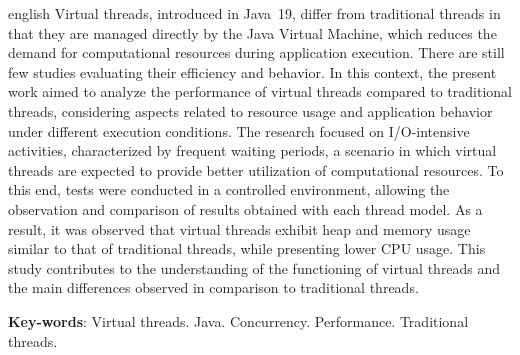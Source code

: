 \documentclass[12pt, openright, oneside, a4paper, english,	french,	spanish, brazil	]{abntex2}
\begin{document}
    \begin{resumo}[Abstract]
        \begin{otherlanguage*}{english}
            Virtual threads, introduced in Java~19, differ from traditional threads in that they are managed directly by the Java Virtual Machine, which reduces the demand for computational resources during application execution. There are still few studies evaluating their efficiency and behavior. In this context, the present work aimed to analyze the performance of virtual threads compared to traditional threads, considering aspects related to resource usage and application behavior under different execution conditions. The research focused on I/O-intensive activities, characterized by frequent waiting periods, a scenario in which virtual threads are expected to provide better utilization of computational resources. To this end, tests were conducted in a controlled environment, allowing the observation and comparison of results obtained with each thread model. As a result, it was observed that virtual threads exhibit heap and memory usage similar to that of traditional threads, while presenting lower CPU usage. This study contributes to the understanding of the functioning of virtual threads and the main differences observed in comparison to traditional threads.

            \noindent \textbf{Key-words}: Virtual threads. Java. Concurrency. Performance. Traditional threads.
                
        \end{otherlanguage*}
    \end{resumo}

    \listoffigures*
    \cleardoublepage

    \listoftables*
    \cleardoublepage
\end{document}
